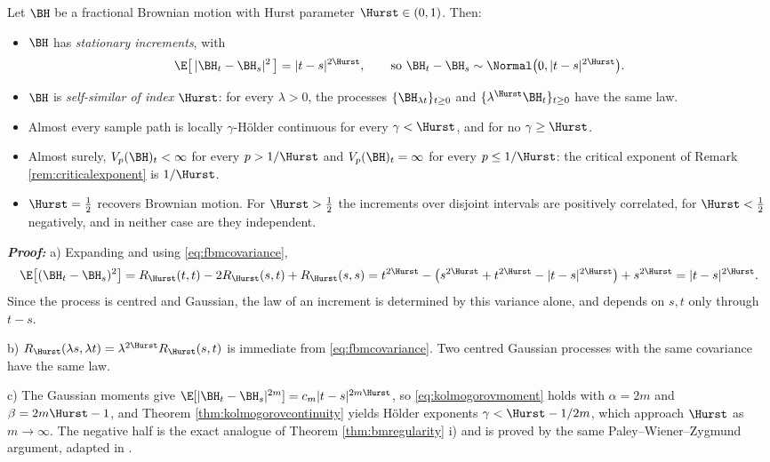 \begin{proposition}\label{prop:fbmproperties}
Let $\BH$ be a fractional Brownian motion with Hurst parameter $\Hurst \in (0,1)$. Then:
\begin{itemize}
    \item[a)] $\BH$ has \emph{stationary increments}, with
    \begin{equation}\label{eq:fbmincrement}
        \E\bigl[\,|\BH_t - \BH_s|^2\,\bigr] = |t-s|^{2\Hurst}, \qquad \text{so } \BH_t - \BH_s \sim \Normal\bigl(0, |t-s|^{2\Hurst}\bigr).
    \end{equation}
    \item[b)] $\BH$ is \emph{self-similar of index $\Hurst$}: for every $\lambda>0$, the processes
    $\{\BH_{\lambda t}\}_{t\geq0}$ and $\{\lambda^{\Hurst}\BH_t\}_{t \geq 0}$ have the same law.
    \item[c)] Almost every sample path is locally $\gamma$-Hölder continuous for every
    $\gamma < \Hurst$, and for no $\gamma \geq \Hurst$.
    \item[d)] Almost surely, $V_p(\BH)_t < \infty$ for every $p > 1/\Hurst$ and $V_p(\BH)_t = \infty$
    for every $p \leq 1/\Hurst$: the critical exponent of Remark \ref{rem:criticalexponent} is
    $1/\Hurst$.
    \item[e)] $\Hurst = \tfrac12$ recovers Brownian motion. For $\Hurst > \tfrac12$ the increments
    over disjoint intervals are positively correlated, for $\Hurst < \tfrac12$ negatively, and in
    neither case are they independent.
\end{itemize}
\end{proposition}

\textbf{\textit{Proof:}} a) Expanding and using \eqref{eq:fbmcovariance},
\[
\E\bigl[(\BH_t-\BH_s)^2\bigr] = R_\Hurst(t,t) - 2R_\Hurst(s,t) + R_\Hurst(s,s)
= t^{2\Hurst} - \bigl(s^{2\Hurst}+t^{2\Hurst}-|t-s|^{2\Hurst}\bigr) + s^{2\Hurst} = |t-s|^{2\Hurst}.
\]
Since the process is centred and Gaussian, the law of an increment is determined by this variance
alone, and depends on $s,t$ only through $t-s$.

b) $R_\Hurst(\lambda s, \lambda t) = \lambda^{2\Hurst}R_\Hurst(s,t)$ is immediate from
\eqref{eq:fbmcovariance}. Two centred Gaussian processes with the same covariance have the same law.

c) The Gaussian moments give $\E[|\BH_t-\BH_s|^{2m}] = c_m|t-s|^{2m\Hurst}$, so
\eqref{eq:kolmogorovmoment} holds with $\alpha = 2m$ and $\beta = 2m\Hurst - 1$, and Theorem
\ref{thm:kolmogorovcontinuity} yields Hölder exponents $\gamma < \Hurst - 1/2m$, which approach
$\Hurst$ as $m\to\infty$. The negative half is the exact analogue of Theorem \ref{thm:bmregularity}
i) and is proved by the same Paley--Wiener--Zygmund argument, adapted in \cite[Ch.\ 7]{marcusrosen2006}.

